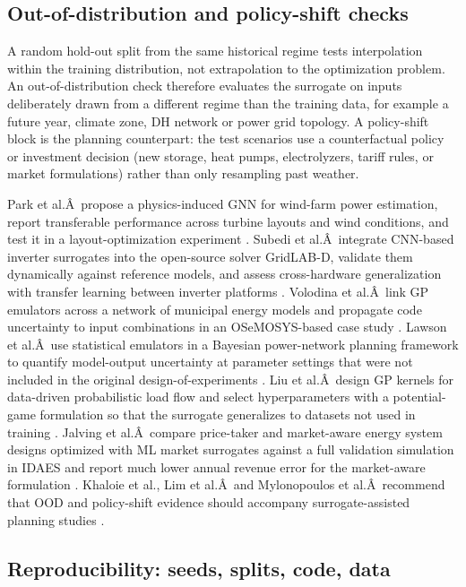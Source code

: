 \documentclass[final,5p,times,twocolumn]{elsarticle}
\begin{document}
\subsection{Out-of-distribution and policy-shift checks}
\label{sec:val:ood}

A random hold-out split from the same historical regime tests
interpolation within the training distribution, not extrapolation to the
optimization problem. An out-of-distribution check therefore evaluates
the surrogate on inputs deliberately drawn from a different regime than
the training data, for example a future year, climate zone, DH network
or power grid topology. A policy-shift block is the planning
counterpart: the test scenarios use a counterfactual policy or
investment decision (new storage, heat pumps, electrolyzers, tariff
rules, or market formulations) rather than only resampling past weather.

Park et al.Â~propose a physics-induced GNN for wind-farm power
estimation, report transferable performance across turbine layouts and
wind conditions, and test it in a layout-optimization experiment
\cite{Park2019}. Subedi et al.Â~integrate CNN-based inverter surrogates into
the open-source solver GridLAB-D, validate them dynamically against
reference models, and assess cross-hardware generalization with transfer
learning between inverter platforms \cite{Subedi2026157}. Volodina et
al.Â~link GP emulators across a network of municipal energy models and
propagate code uncertainty to input combinations in an OSeMOSYS-based
case study \cite{Volodina2022}. Lawson et al.Â~use statistical emulators in a
Bayesian power-network planning framework to quantify model-output
uncertainty at parameter settings that were not included in the original
design-of-experiments \cite{Lawson201647}. Liu et al.Â~design GP kernels for
data-driven probabilistic load flow and select hyperparameters with a
potential-game formulation so that the surrogate generalizes to datasets
not used in training \cite{Liu20222679}. Jalving et al.Â~compare price-taker
and market-aware energy system designs optimized with ML market
surrogates against a full validation simulation in IDAES and report much
lower annual revenue error for the market-aware formulation
\cite{Jalving2023}. Khaloie et al., Lim et al.Â~and Mylonopoulos et
al.Â~recommend that OOD and policy-shift evidence should
accompany surrogate-assisted planning studies
\cite{Khaloie2025,Lim2025,Mylonopoulos202332697}.

\subsection{Reproducibility: seeds, splits, code, data}
\label{sec:val:repro}
\end{document}
